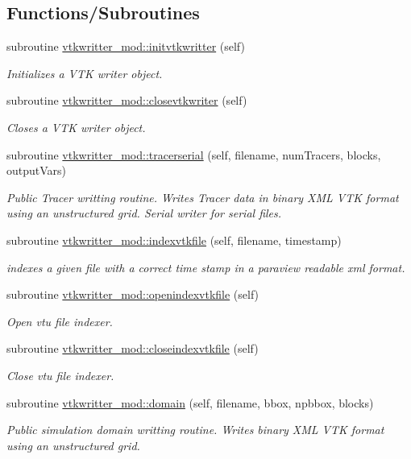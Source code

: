 \subsection*{Functions/\+Subroutines}
\begin{DoxyCompactItemize}
\item 
subroutine \mbox{\hyperlink{namespacevtkwritter__mod_abd35d591c8e15730a277b2d26deb83e8}{vtkwritter\+\_\+mod\+::initvtkwritter}} (self)
\begin{DoxyCompactList}\small\item\em Initializes a V\+TK writer object. \end{DoxyCompactList}\item 
subroutine \mbox{\hyperlink{namespacevtkwritter__mod_a13f1b870d2367704bcd4143a80b552f9}{vtkwritter\+\_\+mod\+::closevtkwriter}} (self)
\begin{DoxyCompactList}\small\item\em Closes a V\+TK writer object. \end{DoxyCompactList}\item 
subroutine \mbox{\hyperlink{namespacevtkwritter__mod_abe9e092f90713f5e00585f915fe86c2c}{vtkwritter\+\_\+mod\+::tracerserial}} (self, filename, num\+Tracers, blocks, output\+Vars)
\begin{DoxyCompactList}\small\item\em Public Tracer writting routine. Writes Tracer data in binary X\+ML V\+TK format using an unstructured grid. Serial writer for serial files. \end{DoxyCompactList}\item 
subroutine \mbox{\hyperlink{namespacevtkwritter__mod_a4c50b52b496bad6b053ffd5749da1582}{vtkwritter\+\_\+mod\+::indexvtkfile}} (self, filename, timestamp)
\begin{DoxyCompactList}\small\item\em indexes a given file with a correct time stamp in a paraview readable xml format. \end{DoxyCompactList}\item 
subroutine \mbox{\hyperlink{namespacevtkwritter__mod_a0c26bb22a8b7dd9f9da69309ad65d669}{vtkwritter\+\_\+mod\+::openindexvtkfile}} (self)
\begin{DoxyCompactList}\small\item\em Open vtu file indexer. \end{DoxyCompactList}\item 
subroutine \mbox{\hyperlink{namespacevtkwritter__mod_a6f9a731d9dee5651f85d4aeed3f3ea5d}{vtkwritter\+\_\+mod\+::closeindexvtkfile}} (self)
\begin{DoxyCompactList}\small\item\em Close vtu file indexer. \end{DoxyCompactList}\item 
subroutine \mbox{\hyperlink{namespacevtkwritter__mod_a9f44d9fd1c5da759c4f2d721d12a8181}{vtkwritter\+\_\+mod\+::domain}} (self, filename, bbox, npbbox, blocks)
\begin{DoxyCompactList}\small\item\em Public simulation domain writting routine. Writes binary X\+ML V\+TK format using an unstructured grid. \end{DoxyCompactList}\end{DoxyCompactItemize}

